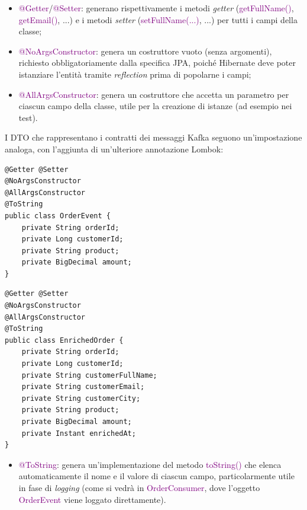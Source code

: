 \begin{itemize}
    \item \textcolor{purple}{@Getter}/\textcolor{purple}{@Setter}: generano rispettivamente i metodi \textit{getter} (\textcolor{purple}{getFullName()}, \textcolor{purple}{getEmail()}, ...) e i metodi \textit{setter} (\textcolor{purple}{setFullName(...)}, ...) per tutti i campi della classe;
    \item \textcolor{purple}{@NoArgsConstructor}: genera un costruttore vuoto (senza argomenti), richiesto obbligatoriamente dalla specifica \acrshort{JPA}, poiché \gls{Hibernate} deve poter istanziare l'entità tramite \textit{reflection} prima di popolarne i campi;
    \item \textcolor{purple}{@AllArgsConstructor}: genera un costruttore che accetta un parametro per ciascun campo della classe, utile per la creazione di istanze (ad esempio nei test).
\end{itemize}
I \acrshort{DTO} che rappresentano i contratti dei messaggi Kafka seguono un'impostazione analoga, con l'aggiunta di un'ulteriore annotazione \gls{Lombok}:
\begin{codelisting}[H]
\begin{verbatim}
@Getter @Setter 
@NoArgsConstructor 
@AllArgsConstructor 
@ToString
public class OrderEvent {
    private String orderId;
    private Long customerId;
    private String product;
    private BigDecimal amount;
}
\end{verbatim}
\caption{OrderEvent}
\end{codelisting}
\begin{codelisting}[H]
\begin{verbatim}
@Getter @Setter 
@NoArgsConstructor 
@AllArgsConstructor 
@ToString
public class EnrichedOrder {
    private String orderId;
    private Long customerId;
    private String customerFullName;
    private String customerEmail;
    private String customerCity;
    private String product;
    private BigDecimal amount;
    private Instant enrichedAt;
}
\end{verbatim}
\caption{EnrichedOrder}
\end{codelisting}
\begin{itemize}
    \item \textcolor{purple}{@ToString}: genera un'implementazione del metodo \textcolor{purple}{toString()} che elenca automaticamente il nome e il valore di ciascun campo, particolarmente utile in fase di \textit{logging} (come si vedrà in \textcolor{purple}{OrderConsumer}, dove l'oggetto \textcolor{purple}{OrderEvent} viene loggato direttamente).
\end{itemize}

